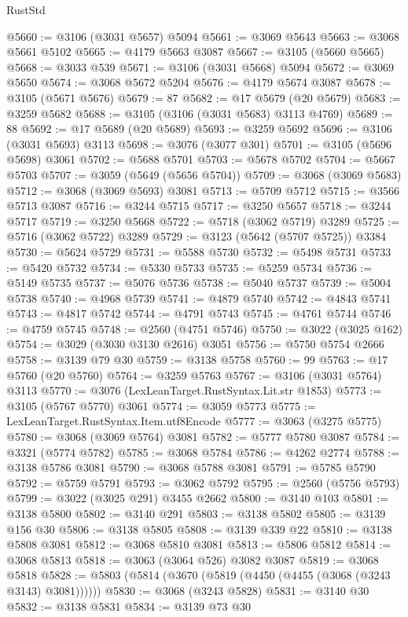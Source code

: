 \begin{lexlean}{RustStd}
\begin{coremodule}
@5660 := @3106 (@3031 @5657) @5094
@5661 := @3069 @5643
@5663 := @3068 @5661 @5102
@5665 := @4179 @5663 @3087
@5667 := @3105 (@5660 @5665)
@5668 := @3033 @539
@5671 := @3106 (@3031 @5668) @5094
@5672 := @3069 @5650
@5674 := @3068 @5672 @5204
@5676 := @4179 @5674 @3087
@5678 := @3105 (@5671 @5676)
@5679 := 87
@5682 := @17 @5679 (@20 @5679)
@5683 := @3259 @5682
@5688 := @3105 (@3106 (@3031 @5683) @3113 @4769)
@5689 := 88
@5692 := @17 @5689 (@20 @5689)
@5693 := @3259 @5692
@5696 := @3106 (@3031 @5693) @3113
@5698 := @3076 (@3077 @301)
@5701 := @3105 (@5696 @5698) @3061
@5702 := @5688 @5701
@5703 := @5678 @5702
@5704 := @5667 @5703
@5707 := @3059 (@5649 (@5656 @5704))
@5709 := @3068 (@3069 @5683)
@5712 := @3068 (@3069 @5693) @3081
@5713 := @5709 @5712
@5715 := @3566 @5713 @3087
@5716 := @3244 @5715
@5717 := @3250 @5657
@5718 := @3244 @5717
@5719 := @3250 @5668
@5722 := @5718 (@3062 @5719) @3289
@5725 := @5716 (@3062 @5722) @3289
@5729 := @3123 (@5642 (@5707 @5725)) @3384
@5730 := @5624 @5729
@5731 := @5588 @5730
@5732 := @5498 @5731
@5733 := @5420 @5732
@5734 := @5330 @5733
@5735 := @5259 @5734
@5736 := @5149 @5735
@5737 := @5076 @5736
@5738 := @5040 @5737
@5739 := @5004 @5738
@5740 := @4968 @5739
@5741 := @4879 @5740
@5742 := @4843 @5741
@5743 := @4817 @5742
@5744 := @4791 @5743
@5745 := @4761 @5744
@5746 := @4759 @5745
@5748 := @2560 (@4751 @5746)
@5750 := @3022 (@3025 @162)
@5754 := @3029 (@3030 @3130 @2616) @3051
@5756 := @5750 @5754 @2666
@5758 := @3139 @79 @30
@5759 := @3138 @5758
@5760 := 99
@5763 := @17 @5760 (@20 @5760)
@5764 := @3259 @5763
@5767 := @3106 (@3031 @5764) @3113
@5770 := @3076 (LexLeanTarget.RustSyntax.Lit.str @1853)
@5773 := @3105 (@5767 @5770) @3061
@5774 := @3059 @5773
@5775 := LexLeanTarget.RustSyntax.Item.utf8Encode
@5777 := @3063 (@3275 @5775)
@5780 := @3068 (@3069 @5764) @3081
@5782 := @5777 @5780 @3087
@5784 := @3321 (@5774 @5782)
@5785 := @3068 @5784
@5786 := @4262 @2774
@5788 := @3138 @5786 @3081
@5790 := @3068 @5788 @3081
@5791 := @5785 @5790
@5792 := @5759 @5791
@5793 := @3062 @5792
@5795 := @2560 (@5756 @5793)
@5799 := @3022 (@3025 @291) @3455 @2662
@5800 := @3140 @103
@5801 := @3138 @5800
@5802 := @3140 @291
@5803 := @3138 @5802
@5805 := @3139 @156 @30
@5806 := @3138 @5805
@5808 := @3139 @339 @22
@5810 := @3138 @5808 @3081
@5812 := @3068 @5810 @3081
@5813 := @5806 @5812
@5814 := @3068 @5813
@5818 := @3063 (@3064 @526) @3082 @3087
@5819 := @3068 @5818
@5828 := @5803 (@5814 (@3670 (@5819 (@4450 (@4455 (@3068 (@3243 @3143) @3081))))))
@5830 := @3068 (@3243 @5828)
@5831 := @3140 @30
@5832 := @3138 @5831
@5834 := @3139 @73 @30

\end{coremodule}
\end{lexlean}
